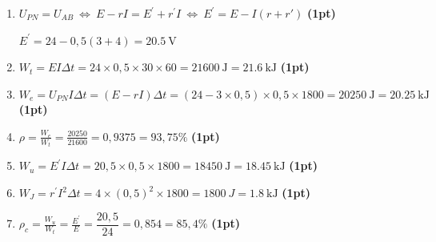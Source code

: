 \begin{enumerate}
    \item $U_{PN}=U_{AB} \ \Leftrightarrow \
          E-rI=E^{\prime}+r^{\prime}I \ \Leftrightarrow \
          E^{\prime}=E-I(r+r')$
          \hfill\textbf{(1pt)}

          $E^{\prime}=24-0,5(3+4)=\qty{20.5}{\V}$

    \item $W_t=EI\Delta t=
          24\times0,5\times30\times60=\qty{21600}{\J}=\qty{21.6}{\kJ}$
          \hfill\textbf{(1pt)}

    \item $W_e=U_{PN}I\Delta t=(E-rI)\Delta t=
          (24-3\times0,5)\times0,5\times1800=\qty{20250}{\J}=\qty{20.25}{\kJ}$
          \hfill\textbf{(1pt)}

    \item $\rho=\frac{W_e}{W_t}=\frac{20250}{21600}=0,9375=93,75\%$
          \hfill\textbf{(1pt)}

    \item $W_u=E^{\prime}I\Delta t=
          20,5\times0,5\times1800=\qty{18450}{\J}=\qty{18.45}{\kJ}$
          \hfill\textbf{(1pt)}

    \item $W_J=r^{\prime}I^2\Delta t=
          4\times(0,5)^2\times1800=\qty{1800}{J}=\qty{1,8}{\kJ}$
          \hfill\textbf{(1pt)}

    \item $\rho_c=\frac{W_u}{W_t}=\frac{E^{\prime}}{E}=
          \dfrac{20,5}{24}=0,854=85,4\%$
          \hfill\textbf{(1pt)}
\end{enumerate}

